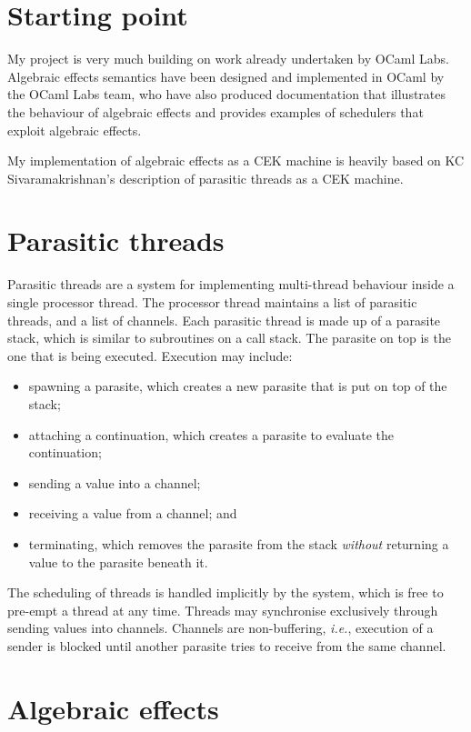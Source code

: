 \documentclass[12pt,a4paper,twoside,openright]{report}
\begin{document}
\section{Starting point}\label{prepstart}

My project is very much building on work already undertaken by OCaml Labs. Algebraic effects semantics have been designed and implemented in OCaml by the OCaml Labs team, who have also produced documentation that illustrates the behaviour of algebraic effects and provides examples of schedulers that exploit algebraic effects.

My implementation of algebraic effects as a CEK machine is heavily based on KC Sivaramakrishnan's description of parasitic threads as a CEK machine.\cite{Siv2014}

\section{Parasitic threads}\label{preppara}
Parasitic threads are a system for implementing multi-thread behaviour inside a single processor thread. The processor thread maintains a list of parasitic threads, and a list of channels. Each parasitic thread is made up of a parasite stack, which is similar to subroutines on a call stack. The parasite on top is the one that is being executed. Execution may include: 

\begin{itemize}
\item spawning a parasite, which creates a new parasite that is put on top of the stack; 
\item attaching a continuation, which creates a parasite to evaluate the continuation;
\item sending a value into a channel;
\item receiving a value from a channel; and 
\item terminating, which removes the parasite from the stack \textit{without} returning a value to the parasite beneath it.
\end{itemize}

The scheduling of threads is handled implicitly by the system, which is free to pre-empt a thread at any time.  Threads may synchronise exclusively through sending values into channels. Channels are non-buffering, \textit{i.e.}, execution of a sender is blocked until another parasite tries to receive from the same channel.

\section{Algebraic effects}\label{prepalg}
\end{document}
